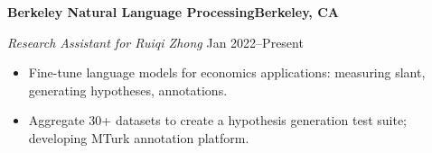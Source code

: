 \textbf{Berkeley Natural Language Processing\hfill Berkeley, CA}\par
\textit{Research Assistant for Ruiqi Zhong} \hfill Jan 2022--Present\par
\begin{itemize}
	\item Fine-tune language models for economics applications: measuring slant, generating hypotheses, annotations.
	\item Aggregate 30+ datasets to create a hypothesis generation test suite; developing MTurk annotation platform.
\end{itemize} \par